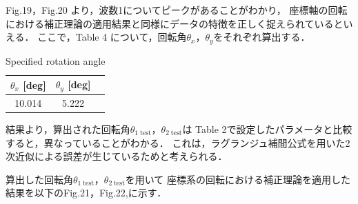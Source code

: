 \documentclass[twocolumn,a4j]{jsarticle}
\begin{document}
Fig.19，Fig.20 より，波数1についてピークがあることがわかり，
座標軸の回転における補正理論の適用結果と同様にデータの特徴を正しく捉えられているといえる．
ここで，Table 4 について，回転角$\theta_x$，$\theta_y$をそれぞれ算出する．

\begin{table}[htbp]
    \begin{center}
        \caption{Specified rotation angle}
        \begin{tabular}{|p{30mm}|p{20mm}|p{20mm}|}
            \hline
            \multicolumn{1}{|c|}{$\theta_x$ [deg]} & \multicolumn{1}{|c|}{$\theta_y$ [deg]} \\ \hline
            \multicolumn{1}{|c|}{10.014}           & \multicolumn{1}{|c|}{5.222}           \\ \hline
        \end{tabular}
    \end{center}
\end{table}

結果より，算出された回転角$\theta_{1\;\mathrm{test}}$，$\theta_{2\;\mathrm{test}}$は
Table 2で設定したパラメータと比較すると，異なっていることがわかる．
これは，ラグランジュ補間公式を用いた2次近似による誤差が生じているためと考えられる．

算出した回転角$\theta_{1\;\mathrm{test}}$，$\theta_{2\;\mathrm{test}}$を用いて
座標系の回転における補正理論を適用した結果を以下のFig.21，Fig.22,に示す．

\newpage
\end{document}
